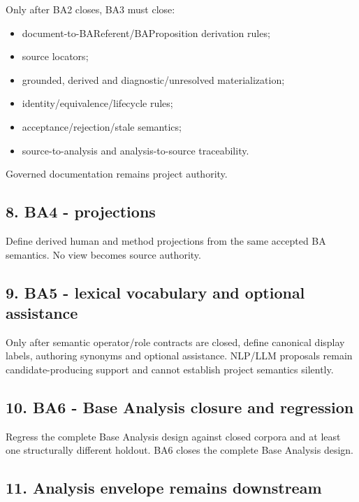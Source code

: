 \documentclass[
  10pt,
  a4paper,
]{article}
\providecommand{\tightlist}{%
  \setlength{\itemsep}{0pt}\setlength{\parskip}{0pt}}
\begin{document}
Only after BA2 closes, BA3 must close:

\begin{itemize}
\tightlist
\item
  document-to-BAReferent/BAProposition derivation rules;
\item
  source locators;
\item
  grounded, derived and diagnostic/unresolved materialization;
\item
  identity/equivalence/lifecycle rules;
\item
  acceptance/rejection/stale semantics;
\item
  source-to-analysis and analysis-to-source traceability.
\end{itemize}

Governed documentation remains project authority.

\subsection{8. BA4 - projections}\label{8-ba4---projections}

Define derived human and method projections from the same accepted BA
semantics. No view becomes source authority.

\subsection{9. BA5 - lexical vocabulary and optional
assistance}\label{9-ba5---lexical-vocabulary-and-optional-assistance}

Only after semantic operator/role contracts are closed, define canonical
display labels, authoring synonyms and optional assistance. NLP/LLM
proposals remain candidate-producing support and cannot establish
project semantics silently.

\subsection{10. BA6 - Base Analysis closure and
regression}\label{10-ba6---base-analysis-closure-and-regression}

Regress the complete Base Analysis design against closed corpora and at
least one structurally different holdout. BA6 closes the complete Base
Analysis design.

\subsection{11. Analysis envelope remains
downstream}\label{11-analysis-envelope-remains-downstream}
\end{document}
